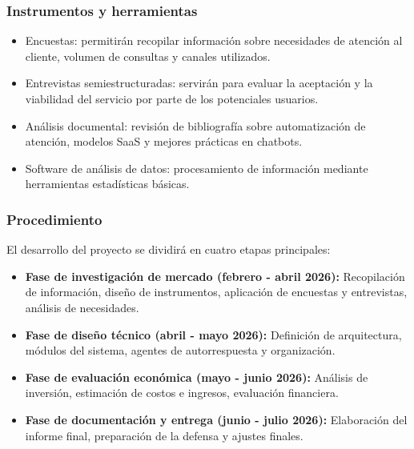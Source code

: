 \subsubsection{Instrumentos y herramientas}
\begin{itemize}
    \item Encuestas: permitirán recopilar información sobre necesidades de atención al cliente, volumen de consultas y canales utilizados.

    \item Entrevistas semiestructuradas: servirán para evaluar la aceptación y la viabilidad del servicio por parte de los potenciales usuarios.

    \item Análisis documental: revisión de bibliografía sobre automatización de atención, modelos SaaS y mejores prácticas en chatbots.

    \item Software de análisis de datos: procesamiento de información mediante herramientas estadísticas básicas.
\end{itemize}

\subsubsection{Procedimiento}
El desarrollo del proyecto se dividirá en cuatro etapas principales:

\begin{itemize}
    \item \textbf{Fase de investigación de mercado (febrero - abril 2026):} Recopilación de información, diseño de instrumentos, aplicación de encuestas y entrevistas, análisis de necesidades.

    \item \textbf{Fase de diseño técnico (abril - mayo 2026):} Definición de arquitectura, módulos del sistema, agentes de autorrespuesta y organización.

    \item \textbf{Fase de evaluación económica (mayo - junio 2026):} Análisis de inversión, estimación de costos e ingresos, evaluación financiera.

    \item \textbf{Fase de documentación y entrega (junio - julio 2026):} Elaboración del informe final, preparación de la defensa y ajustes finales.
\end{itemize}

